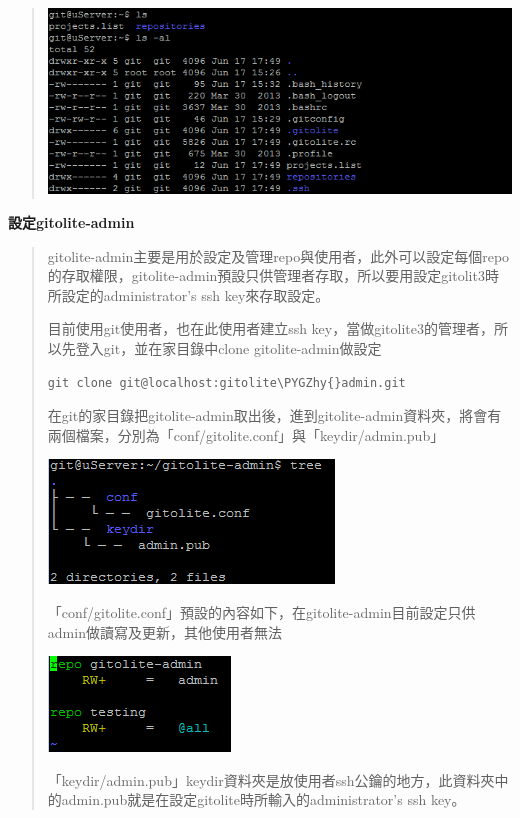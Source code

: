 \documentclass[letterpaper,10pt,english]{sphinxmanual}
\def\PYGZhy{\char`\-}
\begin{document}
\begin{quote}
\includegraphics{gitolite3-list.png}
\end{quote}

\textbf{設定gitolite-admin}
\begin{quote}

gitolite-admin主要是用於設定及管理repo與使用者，此外可以設定每個repo的存取權限，gitolite-admin預設只供管理者存取，所以要用設定gitolit3時所設定的administrator's ssh key來存取設定。

目前使用git使用者，也在此使用者建立ssh key，當做gitolite3的管理者，所以先登入git，並在家目錄中clone gitolite-admin做設定

\begin{Verbatim}[commandchars=\\\{\}]
git clone git@localhost:gitolite\PYGZhy{}admin.git
\end{Verbatim}

在git的家目錄把gitolite-admin取出後，進到gitolite-admin資料夾，將會有兩個檔案，分別為「conf/gitolite.conf」與「keydir/admin.pub」

\includegraphics{gitolite3-admin-tree.png}

「conf/gitolite.conf」預設的內容如下，在gitolite-admin目前設定只供admin做讀寫及更新，其他使用者無法

\includegraphics{gitolite3-admin-config.png}

「keydir/admin.pub」keydir資料夾是放使用者ssh公鑰的地方，此資料夾中的admin.pub就是在設定gitolite時所輸入的administrator's ssh key。
\end{quote}
\end{document}
